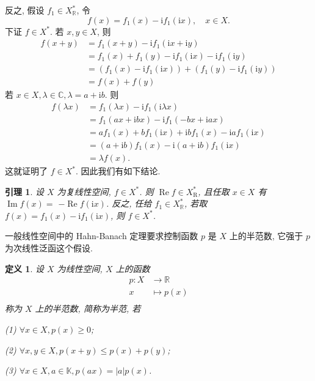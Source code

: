 \documentclass[openany]{ctexbook}
\theoremstyle{kaiti}
\newtheorem{definition}{定义}[section]
\newtheorem{lemma}{引理}[section]
\theoremstyle{normal}
\begin{document}
反之, 假设 $f_1 \in X_{\mathbb{R}}^{*}$, 令
$$
f(x)=f_1(x)-\mathrm{i} f_1(\mathrm{i} x), \quad x \in X.
$$
下证 $f \in X^{*}$. 若 $x, y \in X$, 则
$$
\begin{aligned}
f(x+y) &=f_1(x+y)-\mathrm{i} f_1(\mathrm{i} x+\mathrm{i} y) \\
&=f_1(x)+f_1(y)-\mathrm{i} f_1(\mathrm{i} x)-\mathrm{i} f_1(\mathrm{i} y) \\
&=\left(f_1(x)-\mathrm{i} f_1(\mathrm{i} x)\right)+\left(f_1(y)-\mathrm{i} f_1(\mathrm{i} y)\right) \\
&=f(x)+f(y)
\end{aligned}
$$
若 $x \in X, \lambda \in \mathbb{C}, \lambda=a+\mathrm{i} b$. 则
$$
\begin{aligned}
f(\lambda x) &=f_1(\lambda x)-\mathrm{i} f_1(\mathrm{i} \lambda x) \\
&=f_1(a x+\mathrm{i} b x)-\mathrm{i} f_1(-b x+\mathrm{i} a x) \\
&=a f_1(x)+b f_1(\mathrm{i} x)+\mathrm{i} b f_1(x)-\mathrm{i} a f_1(\mathrm{i} x) \\
&=(a+\mathrm{i} b) f_1(x)-\mathrm{i}(a+\mathrm{i} b) f_1(\mathrm{i} x) \\
&=\lambda f(x).
\end{aligned}
$$
这就证明了 $f \in X^{*}$. 因此我们有如下结论.

\begin{lemma}
设 $X$ 为复线性空间, $f \in X^{*}$. 则 $\operatorname{Re} f \in X_{\mathrm{R}}^{*}$, 且任取 $x \in X$ 有 $\operatorname{Im} f(x)=$ $-\operatorname{Re} f(\mathrm{i} x)$. 反之, 任给 $f_1 \in X_{\mathbb{R}}^{*}$, 若取 $f(x)=f_1(x)-\mathrm{i} f_1(\mathrm{i} x)$, 则 $f \in X^{*}$.
\end{lemma}

一般线性空间中的 Hahn-Banach 定理要求控制函数 $p$ 是 $X$ 上的半范数, 它强于 $p$ 为次线性泛函这个假设.

\begin{definition}
设 $X$ 为线性空间, $X$ 上的函数
$$
  \begin{aligned}
    p: X &\rightarrow \mathbb{R} \\
    x &\mapsto p(x) \\
  \end{aligned}
$$
称为 $X$ 上的半范数, 简称为半范, 若

(1) $\forall x \in X, p(x) \geqslant 0$;

(2) $\forall x, y \in X, p(x+y) \leqslant p(x)+p(y)$;

(3) $\forall x \in X, a \in \mathbb{K}, p(a x)=|a| p(x)$.
\end{definition}
\end{document}
